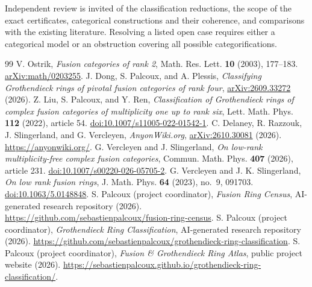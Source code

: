 \documentclass[11pt,a4paper]{article}
\begin{document}
Independent review is invited of the classification reductions, the scope
of the exact certificates, categorical constructions and their coherence,
and comparisons with the existing literature. Resolving a listed open
case requires either a categorical model or an obstruction covering all
possible categorifications.

\begin{thebibliography}{99}\small
\setlength{\itemsep}{2pt}\setlength{\parskip}{0pt}
 V. Ostrik, \emph{Fusion categories of rank 2},
Math. Res. Lett. \textbf{10} (2003), 177--183.
\href{https://arxiv.org/abs/math/0203255}{arXiv:math/0203255}.
 J. Dong, S. Palcoux, and A. Plessis,
\emph{Classifying Grothendieck rings of pivotal fusion categories of rank four},
\href{https://arxiv.org/abs/2609.33272}{arXiv:2609.33272} (2026).
 Z. Liu, S. Palcoux, and Y. Ren,
\emph{Classification of Grothendieck rings of complex fusion categories
of multiplicity one up to rank six},
Lett. Math. Phys. \textbf{112} (2022), article 54.
\href{https://doi.org/10.1007/s11005-022-01542-1}{doi:10.1007/s11005-022-01542-1}.
 C. Delaney, R. Razzouk, J. Slingerland, and G. Vercleyen,
\emph{AnyonWiki.org},
\href{https://arxiv.org/abs/2610.30081}{arXiv:2610.30081} (2026).
\url{https://anyonwiki.org/}.
 G. Vercleyen and J. Slingerland,
\emph{On low-rank multiplicity-free complex fusion categories},
Commun. Math. Phys. \textbf{407} (2026), article 231.
\href{https://doi.org/10.1007/s00220-026-05705-2}{doi:10.1007/s00220-026-05705-2}.
 G. Vercleyen and J. K. Slingerland,
\emph{On low rank fusion rings},
J. Math. Phys. \textbf{64} (2023), no.~9, 091703.
\href{https://doi.org/10.1063/5.0148848}{doi:10.1063/5.0148848}.
 S. Palcoux (project coordinator),
\emph{Fusion Ring Census}, AI-generated research repository (2026).
\url{https://github.com/sebastienpalcoux/fusion-ring-census}.
 S. Palcoux (project coordinator),
\emph{Grothendieck Ring Classification}, AI-generated research repository (2026).
\url{https://github.com/sebastienpalcoux/grothendieck-ring-classification}.
 S. Palcoux (project coordinator),
\emph{Fusion \& Grothendieck Ring Atlas}, public project website (2026).
\url{https://sebastienpalcoux.github.io/grothendieck-ring-classification/}.
\end{thebibliography}
\end{document}
